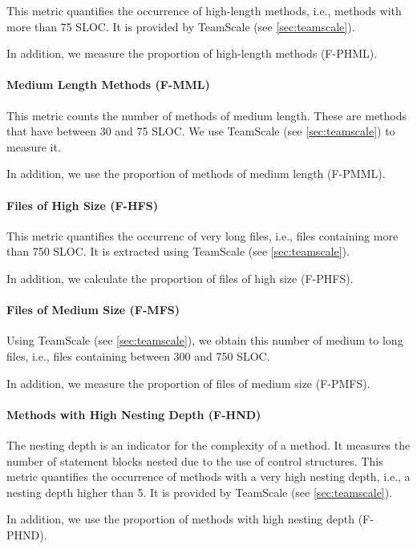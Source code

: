 \documentclass{scrartcl}
\begin{document}
This metric quantifies the occurrence of high-length methods, i.e., methods with
more than 75 SLOC. It is provided by TeamScale (see \ref{sec:teamscale}).

In addition, we measure the proportion of high-length methods (F-PHML).

\paragraph{Medium Length Methods (F-MML)}

This metric counts the number of methods of medium length. These are methods
that have between 30 and 75 SLOC. We use TeamScale (see \ref{sec:teamscale}) to
measure it.

In addition, we use the proportion of methods of medium length (F-PMML).

\paragraph{Files of High Size (F-HFS)}

This metric quantifies the occurrenc of very long files, i.e., files containing
more than 750 SLOC. It is extracted using TeamScale (see \ref{sec:teamscale}).

In addition, we calculate the proportion of files of high size (F-PHFS).

\paragraph{Files of Medium Size (F-MFS)}

Using TeamScale (see \ref{sec:teamscale}), we obtain this number of medium to
long files, i.e., files containing between 300 and 750 SLOC.

In addition, we measure the proportion of files of medium size (F-PMFS).

\paragraph{Methods with High Nesting Depth (F-HND)}

The nesting depth is an indicator for the complexity of a method. It measures
the number of statement blocks nested due to the use of control structures. This
metric quantifies the occurrence of methods with a very high nesting depth,
i.e., a nesting depth higher than 5. It is provided by TeamScale (see
\ref{sec:teamscale}).

In addition, we use the proportion of methods with high nesting depth (F-PHND).
\end{document}

